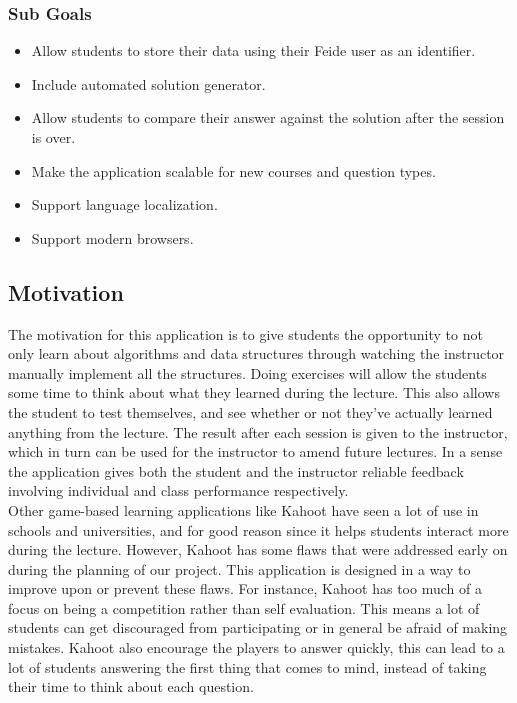 \subsubsection{Sub Goals}
\begin{itemize}
\item Allow students to store their data using their Feide user as an identifier.
\item Include automated solution generator.
\item Allow students to compare their answer against the solution after the session is over.
\item Make the application scalable for new courses and question types.
\item Support language localization.
\item Support modern browsers.
\end{itemize}

\subsection{Motivation}
The motivation for this application is to give students the opportunity to not only learn about algorithms and data structures through watching the instructor manually implement all the structures. Doing exercises will allow the students some time to think about what they learned during the lecture. This also allows the student to test themselves, and see whether or not they've actually learned anything from the lecture. The result after each session is given to the instructor, which in turn can be used for the instructor to amend future lectures. In a sense the application gives both the student and the instructor reliable feedback involving individual and class performance respectively.
\\[11pt]
Other game-based learning applications like Kahoot have seen a lot of use in schools and universities, and for good reason since it helps students interact more during the lecture. However, Kahoot has some flaws that were addressed early on during the planning of our project. This application is designed in a way to improve upon or prevent these flaws. For instance, Kahoot has too much of a focus on being a competition rather than self evaluation. This means a lot of students can get discouraged from participating or in general be afraid of making mistakes. Kahoot also encourage the players to answer quickly, this can lead to a lot of students answering the first thing that comes to mind, instead of taking their time to think about each question.

